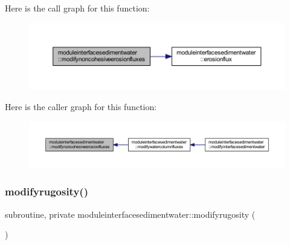 Here is the call graph for this function\+:\nopagebreak
\begin{figure}[H]
\begin{center}
\leavevmode
\includegraphics[width=350pt]{namespacemoduleinterfacesedimentwater_a3ed9cede4da99e95712c02f4a8a6408a_cgraph}
\end{center}
\end{figure}
Here is the caller graph for this function\+:\nopagebreak
\begin{figure}[H]
\begin{center}
\leavevmode
\includegraphics[width=350pt]{namespacemoduleinterfacesedimentwater_a3ed9cede4da99e95712c02f4a8a6408a_icgraph}
\end{center}
\end{figure}
\mbox{\label{namespacemoduleinterfacesedimentwater_aabfaa7472b679988fdb0647b38a7b879}} 
\subsubsection{\texorpdfstring{modifyrugosity()}{modifyrugosity()}}
{\footnotesize\ttfamily subroutine, private moduleinterfacesedimentwater\+::modifyrugosity (\begin{DoxyParamCaption}{ }\end{DoxyParamCaption})\hspace{0.3cm}{\ttfamily [private]}}


